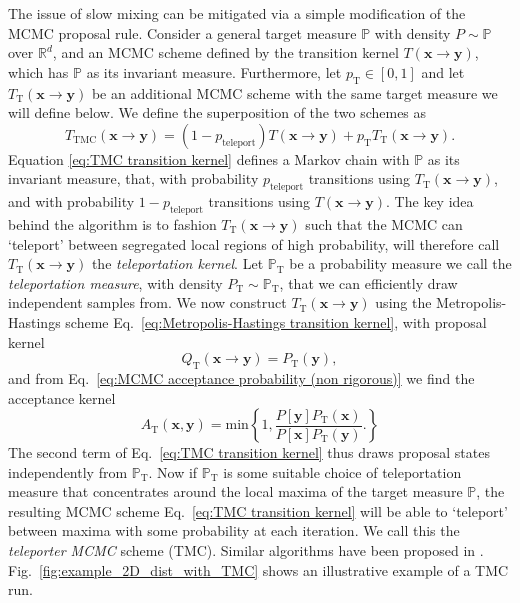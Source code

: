 The issue of slow mixing can be mitigated via a simple modification of the MCMC proposal rule. Consider a general target measure $\mathbb{P}$ with density $P \sim \mathbb{P}$ over $\mathbb{R}^d$, and an MCMC scheme defined by the transition kernel $T(\mathbf{x} \to \mathbf{y})$, which has $\mathbb{P}$ as its invariant measure. Furthermore, let $p_\text{T} \in [0,1]$ and let $T_\text{T}(\mathbf{x} \to \mathbf{y})$ be an additional MCMC scheme with the same target measure we will define below. We define the superposition of the two schemes as
\begin{equation} \label{eq:TMC transition kernel}
	T_\text{TMC} (\mathbf{x} \to \mathbf{y}) = (1 - p_\text{teleport}) T(\mathbf{x} \to \mathbf{y}) + p_\text{T} T_\text{T}(\mathbf{x} \to \mathbf{y}).
\end{equation}
Equation \ref{eq:TMC transition kernel} defines a Markov chain with $\mathbb{P}$ as its invariant measure, that, with probability $p_\text{teleport}$ transitions using $T_\text{T}(\mathbf{x} \to \mathbf{y})$, and with probability $1-p_\text{teleport}$ transitions using $T(\mathbf{x} \to \mathbf{y})$. The key idea behind the algorithm is to fashion $T_\text{T}(\mathbf{x} \to \mathbf{y})$ such that the MCMC can `teleport' between segregated local regions of high probability, will therefore call $T_\text{T}(\mathbf{x} \to \mathbf{y})$ the \textit{teleportation kernel}. Let $\mathbb{P}_\text{T}$ be a probability measure we call the \textit{teleportation measure}, with density $P_\text{T} \sim \mathbb{P}_\text{T}$, that we can efficiently draw independent samples from. We now construct $T_\text{T}(\mathbf{x} \to \mathbf{y})$ using the Metropolis-Hastings scheme Eq.~\ref{eq:Metropolis-Hastings transition kernel}, with proposal kernel
\begin{equation} \label{eq:teleportation proposal}
	Q_\text{T}(\mathbf{x} \to \mathbf{y}) = P_\text{T}(\mathbf{y}),
\end{equation}
and from Eq.~\ref{eq:MCMC acceptance probability (non rigorous)} we find the acceptance kernel
\begin{equation} \label{eq:teleportation acceptance}
	A_\text{T}(\mathbf{x}, \mathbf{y}) = \text{min} \left\{
		1, \frac{P[\mathbf{y}] P_\text{T}(\mathbf{x}) }{P[\mathbf{x}] P_\text{T}(\mathbf{y}) }.
	\right\}
\end{equation}
The second term of Eq.~\ref{eq:TMC transition kernel} thus draws proposal states independently from $\mathbb{P}_\text{T}$. Now if $\mathbb{P}_\text{T}$ is some suitable choice of teleportation measure that concentrates around the local maxima of the target measure $\mathbb{P}$, the resulting MCMC scheme Eq.~\ref{eq:TMC transition kernel} will be able to `teleport' between maxima with some probability at each iteration. We call this the \textit{teleporter MCMC} scheme (TMC). Similar algorithms have been proposed in \citep{sminchisescuModeHoppingMCMCSampler, lindseyEnsembleMarkovChain2021}. Fig.~\ref{fig:example_2D_dist_with_TMC} shows an illustrative example of a TMC run.

